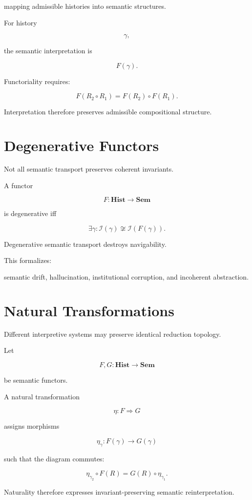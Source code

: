 \documentclass[12pt,openany]{book}
\theoremstyle{plain}
\theoremstyle{definition}
\theoremstyle{remark}
\begin{document}
mapping admissible histories into semantic structures.

For history

\[
\gamma,
\]

the semantic interpretation is

\[
F(\gamma).
\]

Functoriality requires:

\[
F(R_2\circ R_1)
=
F(R_2)\circ F(R_1).
\]

Interpretation therefore preserves admissible compositional
structure.

\section{Degenerative Functors}

Not all semantic transport preserves coherent invariants.

A functor

\[
F :
\mathbf{Hist}
\to
\mathbf{Sem}
\]

is degenerative iff

\[
\exists \gamma
:
\mathcal{I}(\gamma)
\not\cong
\mathcal{I}(F(\gamma)).
\]

Degenerative semantic transport destroys navigability.

This formalizes:

semantic drift,
hallucination,
institutional corruption,
and incoherent abstraction.

\section{Natural Transformations}

Different interpretive systems may preserve identical reduction
topology.

Let

\[
F,G :
\mathbf{Hist}
\to
\mathbf{Sem}
\]

be semantic functors.

A natural transformation

\[
\eta :
F \Rightarrow G
\]

assigns morphisms

\[
\eta_\gamma :
F(\gamma)\to G(\gamma)
\]

such that the diagram commutes:

\[
\eta_{\gamma_2}\circ F(R)
=
G(R)\circ \eta_{\gamma_1}.
\]

Naturality therefore expresses invariant-preserving semantic
reinterpretation.
\end{document}
